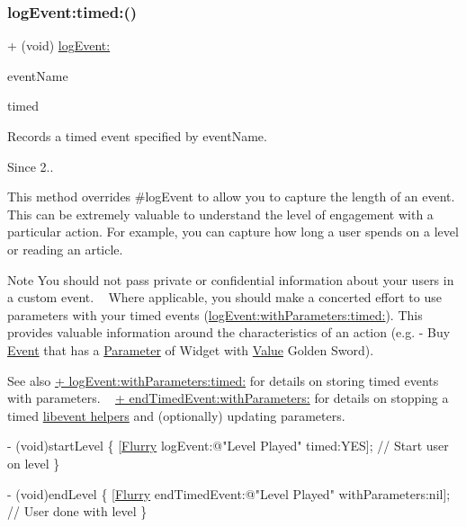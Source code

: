 \subsubsection{\texorpdfstring{log\+Event\+:timed\+:()}{logEvent:timed:()}}
{\footnotesize\ttfamily + (void) \hyperlink{interfaceFlurry_a5433aaf247d3e14120ba05877d034a61}{log\+Event\+:} \begin{DoxyParamCaption}\item[{(N\+S\+String $\ast$)}]{event\+Name }\item[{timed:(B\+O\+OL)}]{timed }\end{DoxyParamCaption}}



Records a timed event specified by {\ttfamily event\+Name}. 

\begin{DoxySince}{Since}
2..
\end{DoxySince}
This method overrides \#log\+Event to allow you to capture the length of an event. This can be extremely valuable to understand the level of engagement with a particular action. For example, you can capture how long a user spends on a level or reading an article.

\begin{DoxyNote}{Note}
You should not pass private or confidential information about your users in a custom event. ~\newline
 Where applicable, you should make a concerted effort to use parameters with your timed events (\hyperlink{interfaceFlurry_a66eeaeb9725692dc354fdd350c691cfc}{log\+Event\+:with\+Parameters\+:timed\+:}). This provides valuable information around the characteristics of an action (e.\+g. -\/ Buy \hyperlink{classEvent}{Event} that has a \hyperlink{structParameter}{Parameter} of Widget with \hyperlink{classValue}{Value} Golden Sword).
\end{DoxyNote}
\begin{DoxySeeAlso}{See also}
\hyperlink{interfaceFlurry_a66eeaeb9725692dc354fdd350c691cfc}{+ log\+Event\+:with\+Parameters\+:timed\+:} for details on storing timed events with parameters. ~\newline
 \hyperlink{interfaceFlurry_a9540add7440d1b716bfb8fb8efa85801}{+ end\+Timed\+Event\+:with\+Parameters\+:} for details on stopping a timed \hyperlink{group__event}{libevent helpers} and (optionally) updating parameters.
\end{DoxySeeAlso}

\begin{DoxyCode}
   - (void)startLevel 
\{
[\hyperlink{interfaceFlurry}{Flurry} logEvent:\textcolor{stringliteral}{@"Level Played"} timed:YES];
\textcolor{comment}{// Start user on level}
\}

- (void)endLevel 
\{
[\hyperlink{interfaceFlurry}{Flurry} endTimedEvent:\textcolor{stringliteral}{@"Level Played"} withParameters:nil];
\textcolor{comment}{// User done with level}
\}
\end{DoxyCode}



